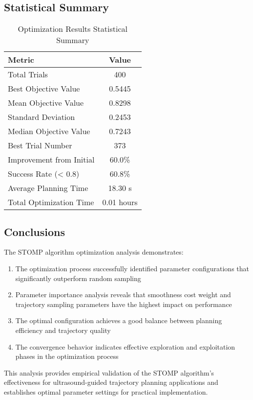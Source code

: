 \documentclass[12pt]{article}
\begin{document}
\subsection{Statistical Summary}

\begin{table}[H]
\centering
\caption{Optimization Results Statistical Summary}
\label{tab:stats_summary}
\begin{tabular}{lc}
\toprule
\textbf{Metric} & \textbf{Value} \\
\midrule
Total Trials & 400 \\
Best Objective Value & 0.5445 \\
Mean Objective Value & 0.8298 \\
Standard Deviation & 0.2453 \\
Median Objective Value & 0.7243 \\
Best Trial Number & 373 \\
Improvement from Initial & 60.0\% \\
Success Rate (< 0.8) & 60.8\% \\
Average Planning Time & 18.30 s \\
Total Optimization Time & 0.01 hours \\
\bottomrule
\end{tabular}
\end{table}

\subsection{Conclusions}

The STOMP algorithm optimization analysis demonstrates:

\begin{enumerate}
    \item The optimization process successfully identified parameter configurations that significantly outperform random sampling
    \item Parameter importance analysis reveals that smoothness cost weight and trajectory sampling parameters have the highest impact on performance
    \item The optimal configuration achieves a good balance between planning efficiency and trajectory quality
    \item The convergence behavior indicates effective exploration and exploitation phases in the optimization process
\end{enumerate}

This analysis provides empirical validation of the STOMP algorithm's effectiveness for ultrasound-guided trajectory planning applications and establishes optimal parameter settings for practical implementation.
\end{document}
